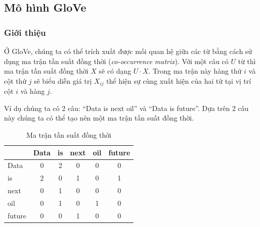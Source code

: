 \subsection{Mô hình GloVe}
\subsubsection{Giới thiệu}
Ở GloVe, chúng ta có thể trích xuất được mối quan hệ giữa các từ bằng cách sử dụng ma trận tần suất đồng thời (\textit{co-occurrence matrix}). Với một câu có $U$ từ thì ma trận tần suất đồng thời $X$ sẽ có dạng $U\cdot X$. Trong ma trận này hàng thứ $i$ và cột thứ $j$ sẽ biểu diễn giá trị $X_{ij}$ thể hiện sự cùng xuất hiện của hai từ tại vị trí cột $i$ và hàng $j$.

Ví dụ chúng ta có 2 câu: ``Data is next oil'' và ``Data is future''. Dựa trên 2 câu này chúng ta có thể tạo nên một ma trận tần suất đồng thời.
\begin{table}[htb]
    \centering
    \caption{Ma trận tần suất đồng thời \cite{webpage9}}
    \label{table:frequency-matrix}
    \begin{tabular}{ l c c c c c }
        \toprule
               & Data & is & next & oil & future \\\midrule
        Data   & 0    & 2  & 0    & 0   & 0      \\
        is     & 2    & 0  & 1    & 0   & 1      \\
        next   & 0    & 1  & 0    & 0   & 0      \\
        oil    & 0    & 1  & 0    & 1   & 0      \\
        future & 0    & 0  & 1    & 0   & 0      \\
        \bottomrule
    \end{tabular}
\end{table}

